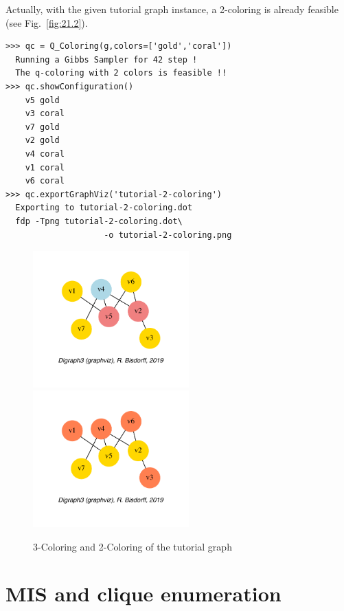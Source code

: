 Actually, with the given tutorial graph instance, a 2-coloring is already feasible (see Fig.~\vref{fig:21.2}).
\begin{lstlisting}
>>> qc = Q_Coloring(g,colors=['gold','coral'])
  Running a Gibbs Sampler for 42 step !
  The q-coloring with 2 colors is feasible !!
>>> qc.showConfiguration()
    v5 gold
    v3 coral
    v7 gold
    v2 gold
    v4 coral
    v1 coral
    v6 coral
>>> qc.exportGraphViz('tutorial-2-coloring')
  Exporting to tutorial-2-coloring.dot
  fdp -Tpng tutorial-2-coloring.dot\
                    -o tutorial-2-coloring.png
\end{lstlisting}
\begin{figure}[h]
\sidecaption[t]
\includegraphics[width=6cm]{Figures/21-2-tutorial-3-coloring.pdf}\hfill
\includegraphics[width=6cm]{Figures/21-2-tutorial-2-coloring.pdf}
\caption{3-Coloring and 2-Coloring of the tutorial graph} 
\label{fig:21.2}       %
\end{figure}

\section{MIS and clique enumeration}
\label{sec:21.3}

